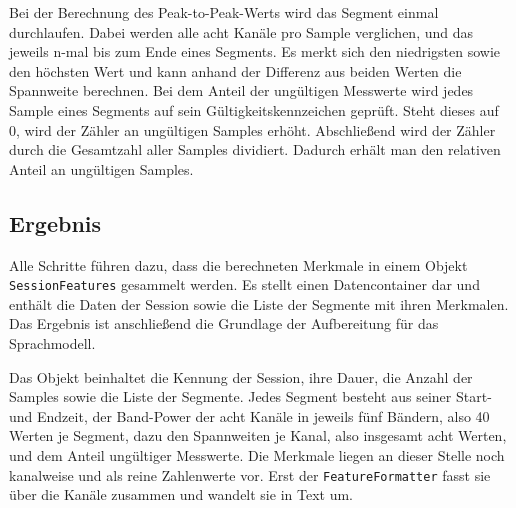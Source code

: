 \noindent Bei der Berechnung des Peak-to-Peak-Werts wird das Segment einmal durchlaufen. Dabei werden alle acht Kanäle pro Sample verglichen, und das jeweils n-mal bis zum Ende eines Segments. Es merkt sich den niedrigsten sowie den höchsten Wert und kann anhand der Differenz aus beiden Werten die Spannweite berechnen.
Bei dem Anteil der ungültigen Messwerte wird jedes Sample eines Segments auf sein Gültigkeitskennzeichen geprüft. Steht dieses auf 0, wird der Zähler an ungültigen Samples erhöht. Abschließend wird der Zähler durch die Gesamtzahl aller Samples dividiert. Dadurch erhält man den relativen Anteil an ungültigen Samples.

\subsection{Ergebnis} Alle Schritte führen dazu, dass die berechneten Merkmale in einem Objekt \texttt{Session\-Features} gesammelt werden. Es stellt einen Datencontainer dar und enthält die Daten der Session sowie die Liste der Segmente mit ihren Merkmalen. Das Ergebnis ist anschließend die Grundlage der Aufbereitung für das Sprachmodell.
\vspace{\baselineskip}

\noindent Das Objekt beinhaltet die Kennung der Session, ihre Dauer, die Anzahl der Samples sowie die Liste der Segmente. Jedes Segment besteht aus seiner Start- und Endzeit, der Band-Power der acht Kanäle in jeweils fünf Bändern, also 40 Werten je Segment, dazu den Spannweiten je Kanal, also insgesamt acht Werten, und dem Anteil ungültiger Messwerte.
Die Merkmale liegen an dieser Stelle noch kanalweise und als reine Zahlenwerte vor. Erst der \texttt{FeatureFormatter} fasst sie über die Kanäle zusammen und wandelt sie in Text um.

